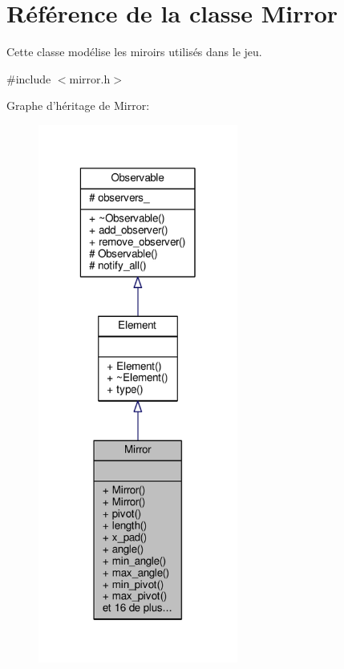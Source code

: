 \hypertarget{classMirror}{\section{Référence de la classe Mirror}
\label{classMirror}
}


Cette classe modélise les miroirs utilisés dans le jeu.  




{\ttfamily \#include $<$mirror.\+h$>$}



Graphe d'héritage de Mirror\+:
\nopagebreak
\begin{figure}[H]
\begin{center}
\leavevmode
\includegraphics[width=186pt]{d8/d7d/classMirror__inherit__graph}
\end{center}
\end{figure}



